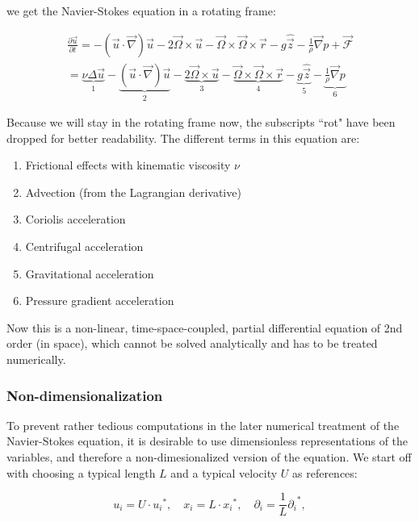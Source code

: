 \documentclass[12pt, a4paper]{article} %
\begin{document}
			we get the Navier-Stokes equation in a rotating frame:
			
			\begin{eqnarray}
				\frac{\partial\vec{u}}{\partial t}
				= - \left(\vec{u}\cdot\vec{\nabla}\right)\vec{u} - 2\vec{\Omega}\times\vec{u} - \vec{\Omega}\times\vec{\Omega}\times\vec{r} - g\hat{\vec{z}} - \frac{1}{\rho}\vec{\nabla}p + \vec{\mathcal{F}}
				\nonumber \\
				= \underbrace{\nu\Delta\vec{u}}_{1} - \underbrace{\left(\vec{u}\cdot\vec{\nabla}\right)\vec{u}}_{2} - \underbrace{2\vec{\Omega}\times\vec{u}}_{3}- \underbrace{\vec{\Omega}\times\vec{\Omega}\times\vec{r}}_{4} - \underbrace{g\hat{\vec{z}}}_{5} - \underbrace{\frac{1}{\rho}\vec{\nabla}p}_{6}
				\label{eq: NSG}
			\end{eqnarray}
			
			Because we will stay in the rotating frame now, the subscripts ``rot" have been dropped for better readability. The different terms in this equation are:
			
				\begin{enumerate}
					\item Frictional effects with kinematic viscosity $\nu$
					\item Advection (from the Lagrangian derivative)
					\item Coriolis acceleration
					\item Centrifugal acceleration
					\item Gravitational acceleration
					\item Pressure gradient acceleration
				\end{enumerate}
			
			Now this is a non-linear, time-space-coupled, partial differential equation of 2nd order (in space), which cannot be solved analytically and has to be treated numerically.
			
		\subsubsection{Non-dimensionalization}
			
			To prevent rather tedious computations in the later numerical treatment of the Navier-Stokes equation, it is desirable to use dimensionless representations of the variables, and therefore a non-dimesionalized version of the equation. We start off with choosing a typical length $L$ and a typical velocity $U$ as references:
			
			\begin{equation}
			u_i = U \cdot {u_i}^*, \quad x_i = L \cdot {x_i}^*, \quad \partial_i = \frac{1}{L}{\partial_i}^* ,
			\nonumber
			\end{equation}
			
\end{document}
